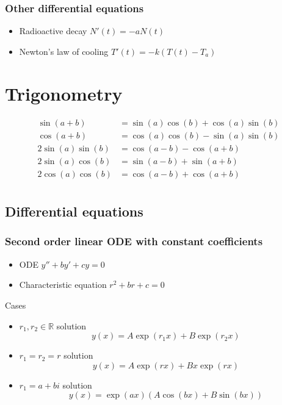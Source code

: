 \documentclass[12pt]{article}
\begin{document}
\subsubsection*{Other differential equations}

\begin{itemize}
\item Radioactive decay $N'(t)=-aN(t)$
\item Newton's law of cooling $T'(t)=-k(T(t)-T_a)$
\end{itemize}

\section*{Trigonometry}

\begin{equation*}
\begin{split}
\sin(a+b)&=\sin(a)\cos(b)+\cos(a)\sin(b)\\
\cos(a+b)&=\cos(a)\cos(b)-\sin(a)\sin(b)\\
2\sin(a)\sin(b) &= \cos(a-b)-\cos(a+b)\\
2\sin(a)\cos(b) &= \sin(a-b)+\sin(a+b)\\
2\cos(a)\cos(b) &= \cos(a-b)+\cos(a+b)\\
\end{split}
\end{equation*}

\newpage
\subsection*{Differential equations}
\subsubsection*{Second order linear ODE with constant coefficients}

\begin{itemize}
\item ODE $y''+by'+cy=0$
\item Characteristic equation $r^2+br+c=0$
\end{itemize}
Cases
\begin{itemize}
\item $r_1,r_2\in\mathbb{R}$ solution
$$
y(x)=A\exp(r_1x)+B\exp(r_2x)
$$
\item $r_1=r_2=r$ solution
$$
y(x)=A\exp(rx)+Bx\exp(rx)
$$
\item $r_1=a+bi$ solution
$$
y(x)=\exp(ax)(A\cos(bx)+B\sin(bx))
$$
\end{itemize}
\end{document}
